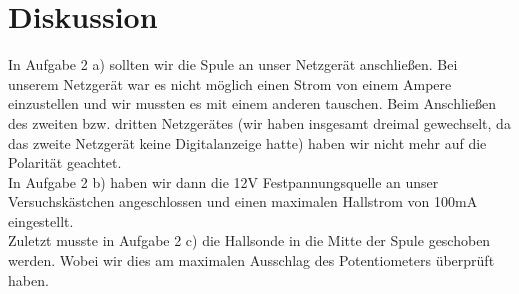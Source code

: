 \documentclass[12pt]{scrartcl}
\begin{document}
\section{Diskussion}

In Aufgabe 2 a) sollten wir die Spule an unser Netzgerät anschließen. Bei unserem Netzgerät war es nicht möglich einen Strom von einem Ampere einzustellen und wir mussten es mit einem anderen tauschen. Beim Anschließen des zweiten bzw. dritten Netzgerätes (wir haben insgesamt dreimal gewechselt, da das zweite Netzgerät keine Digitalanzeige hatte) haben wir nicht mehr auf die Polarität geachtet.\\
In Aufgabe 2 b) haben wir dann die 12V Festpannungsquelle an unser Versuchskästchen angeschlossen und einen maximalen Hallstrom von 100mA eingestellt.\\
Zuletzt musste in Aufgabe 2 c) die Hallsonde in die Mitte der Spule geschoben werden. Wobei wir dies am maximalen Ausschlag des Potentiometers überprüft haben.
\end{document}
